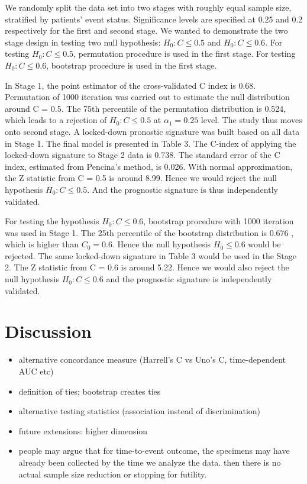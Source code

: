 \documentclass[11pt]{article}
\begin{document}
	\par We randomly split the data set into two stages with roughly equal sample size, stratified by patients' event status. Significance levels are specified at 0.25 and 0.2 respectively for the first and second stage. We wanted to demonstrate the two stage design in testing two null hypothesis: $H_0: C \leq 0.5$ and $H_0: C \leq 0.6$. For testing $H_0: C \leq 0.5$, permutation procedure is used in the first stage. For testing $H_0: C \leq 0.6$, bootstrap procedure is used in the first stage.

	\par In Stage 1, the point estimator of the cross-validated C index is 0.68. Permutation of 1000 iteration was carried out to estimate the null distribution around C = 0.5. The 75th percentile of the permutation distribution is 0.524, which leads to a rejection of $H_0: C \leq 0.5$ at $\alpha_1 = 0.25$ level. The study thus moves onto second stage. A locked-down pronostic signature was built based on all data in Stage 1. The final model is presented in Table 3. The C-index of applying the locked-down signature to Stage 2 data is 0.738. The standard error of the C index, estimated from Pencina's method, is 0.026. With normal approximation, the Z statistic from C = 0.5 is around 8.99. Hence we would reject the null hypothesis $H_0: C \leq 0.5$. And the prognostic signature is thus independently validated.

	\par For testing the hypothesis $H_0: C \leq 0.6$, bootstrap procedure with 1000 iteration was used in Stage 1. The 25th percentile of the bootstrap distribution is 0.676 , which is higher than $C_0 = 0.6$. Hence the null hypothesis $H_0 \leq 0.6$ would be rejected. The same locked-down signature in Table 3 would be used in the Stage 2. The Z statistic from C = 0.6 is around 5.22. Hence we would also reject the null hypothesis $H_0: C \leq 0.6$ and the prognostic signature is independently validated.


\section{Discussion}
	\begin{itemize}
		\item alternative concordance measure (Harrell's C vs Uno's C, time-dependent AUC etc)
		\item definition of ties; bootstrap creates ties
		\item alternative testing statistics (association instead of discrimination)
		\item future extensions: higher dimension
		\item people may argue that for time-to-event outcome, the specimens may have already been collected by the time we analyze the data. then there is no actual sample size reduction or stopping for futility.
	\end{itemize}

\newpage


\end{document}
